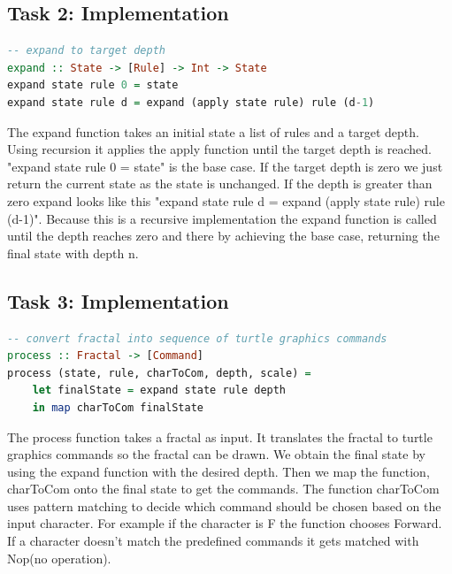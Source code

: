 \documentclass{article}
\begin{document}
\subsection{Task 2: Implementation}
\begin{lstlisting}[language=Haskell]
-- expand to target depth
expand :: State -> [Rule] -> Int -> State
expand state rule 0 = state
expand state rule d = expand (apply state rule) rule (d-1)
\end{lstlisting}
The expand function takes  an initial state a list of rules and a target depth. Using recursion it applies the apply function until the target depth is reached. "expand state rule 0 = state" is the base case. If the target depth is zero we just return the current state as the state is unchanged. If the depth is greater than zero expand looks like this "expand state rule d = expand (apply state rule) rule (d-1)". Because this is a recursive implementation the expand function is called until the depth reaches zero and there by achieving the base case, returning the final state with depth n.

\newpage
\subsection{Task 3: Implementation}
\begin{lstlisting}[language=Haskell]
-- convert fractal into sequence of turtle graphics commands
process :: Fractal -> [Command]
process (state, rule, charToCom, depth, scale) =  
    let finalState = expand state rule depth
    in map charToCom finalState

\end{lstlisting}
The process function takes a fractal as input. It translates the fractal to turtle graphics commands so the fractal can be drawn. We obtain the final state by using the expand function with the desired depth. Then we map the function, charToCom onto the final state to get the commands. The function charToCom uses pattern matching to decide which command should be chosen based on the input character. For example if the character is F the function chooses Forward. If a character doesn't match the predefined commands it gets matched with Nop(no operation). 
\end{document}
